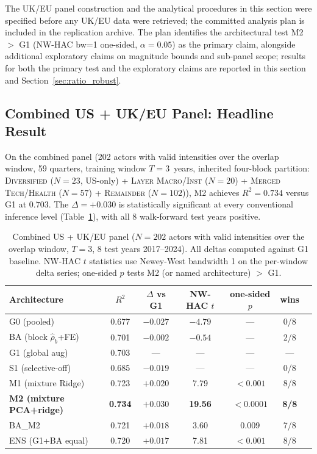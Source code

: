 \documentclass[11pt,a4paper]{article}
\begin{document}
The UK/EU panel construction and the analytical procedures in this section were specified before any UK/EU data were retrieved; the committed analysis plan is included in the replication archive. The plan identifies the architectural test M2 $>$ G1 (NW-HAC bw=1 one-sided, $\alpha = 0.05$) as the primary claim, alongside additional exploratory claims on magnitude bounds and sub-panel scope; results for both the primary test and the exploratory claims are reported in this section and Section~\ref{sec:ratio_robust}.

\subsection{Combined US + UK/EU Panel: Headline Result}

On the combined panel (202 actors with valid intensities over the overlap window, 59 quarters, training window $T=3$~years, inherited four-block partition: \textsc{Diversified} ($N=23$, US-only) + \textsc{Layer Macro/Inst} ($N=20$) + \textsc{Merged Tech/Health} ($N=57$) + \textsc{Remainder} ($N=102$)), M2 achieves $R^2 = 0.734$ versus G1 at $0.703$. The $\Delta = +0.030$ is statistically significant at every conventional inference level (Table~\ref{tab:combined_panel_arch}), with all 8 walk-forward test years positive.

\begin{table}[H]
\centering
\caption{Combined US + UK/EU panel ($N=202$ actors with valid intensities over the overlap window, $T=3$, 8 test years 2017--2024). All deltas computed against G1 baseline. NW-HAC $t$ statistics use Newey-West bandwidth 1 on the per-window delta series; one-sided $p$ tests M2 (or named architecture) $>$ G1.}
\label{tab:combined_panel_arch}
\small
\begin{tabular}{lcccccc}
\toprule
Architecture & $R^2$ & $\Delta$ vs G1 & NW-HAC $t$ & one-sided $p$ & wins \\
\midrule
G0 (pooled) & 0.677 & $-0.027$ & $-4.79$ & --- & 0/8 \\
BA (block $\hat\rho_b$+FE) & 0.701 & $-0.002$ & $-0.54$ & --- & 2/8 \\
G1 (global aug) & 0.703 & --- & --- & --- & --- \\
S1 (selective-off) & 0.685 & $-0.019$ & --- & --- & 0/8 \\
M1 (mixture Ridge) & 0.723 & $+0.020$ & 7.79 & $<0.001$ & 8/8 \\
\textbf{M2 (mixture PCA+ridge)} & \textbf{0.734} & $\mathbf{+0.030}$ & \textbf{19.56} & $\mathbf{<0.0001}$ & \textbf{8/8} \\
BA\_M2 & 0.721 & $+0.018$ & 3.60 & 0.009 & 7/8 \\
ENS (G1+BA equal) & 0.720 & $+0.017$ & 7.81 & $<0.001$ & 8/8 \\
\bottomrule
\end{tabular}
\end{table}
\end{document}
